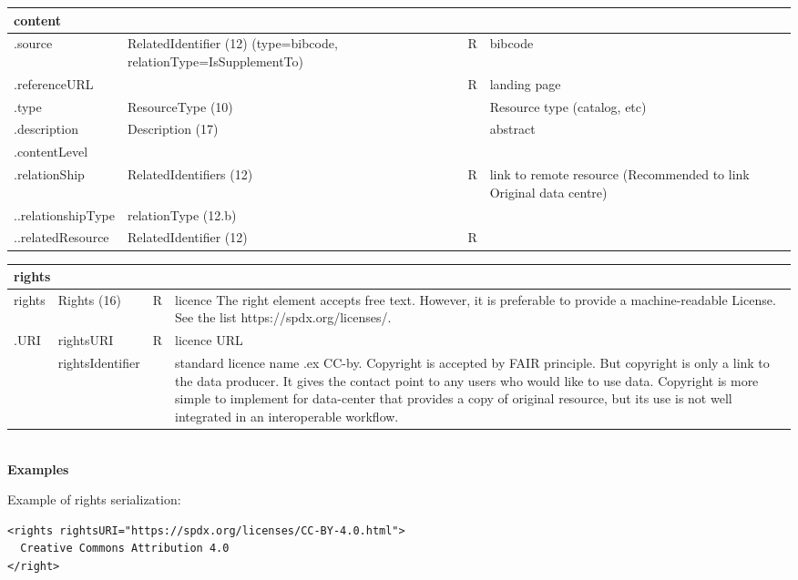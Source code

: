 \documentclass[11pt,a4paper]{ivoa}
\begin{document}
\begin{tabular}{|p{3cm}|p{4cm}|p{1cm}|p{5cm}|} \hline
\multicolumn{4}{|l|}{\textbf{content} } \\ \hline
.source        & RelatedIdentifier (12) (type=bibcode, relationType=IsSupplementTo) & R & bibcode\\ \hline
.referenceURL  & & R & landing page\\ \hline
.type          & ResourceType (10)& & Resource type (catalog, etc)\\ \hline
.description   & Description (17)& & abstract\\ \hline
.contentLevel  & & &\\ \hline
.relationShip  & RelatedIdentifiers (12) & R &link to remote resource (Recommended to link Original data centre) \\ \hline
..relationshipType & relationType (12.b) & &\\ \hline
..relatedResource  & RelatedIdentifier (12) & R &\\ \hline
\end{tabular}

\begin{tabular}{|p{3cm}|p{4cm}|p{1cm}|p{5cm}|} \hline
\multicolumn{4}{|l|}{\textbf{rights}} \\ \hline
rights   & Rights (16)& R& licence
          The right element accepts free text. However, it is preferable to provide a machine-readable License. See the list https://spdx.org/licenses/.
         \\ \hline
.URI     & rightsURI & R& licence URL\\ \hline
         & rightsIdentifier & & standard licence name .ex CC-by.
         Copyright is accepted by FAIR principle. But copyright is only a link to the data producer. It gives the contact point to any users who would like to use data. Copyright is more simple to implement for data-center that provides a copy of original resource, but its use is not well integrated in an interoperable workflow.
         \\ \hline

\end{tabular}\\




\textbf{Examples}

Example of rights serialization:
\begin{verbatim}
<rights rightsURI="https://spdx.org/licenses/CC-BY-4.0.html">
  Creative Commons Attribution 4.0
</right>
\end{verbatim}
\end{document}
